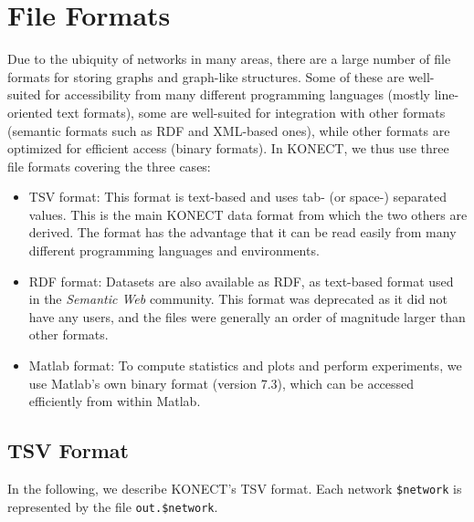 \documentclass{article}
\begin{document}
\section{File Formats}
\label{sec:format}
Due to the ubiquity of networks in many areas, there are a large number
of file formats for storing graphs and graph-like structures.  Some of
these are well-suited for accessibility from many different programming
languages (mostly line-oriented text formats), some are well-suited for
integration with other formats (semantic formats such as RDF and
XML-based ones), while other formats are optimized for efficient access
(binary formats).  In KONECT, we thus use three file formats covering
the three cases:
\begin{itemize}
\item TSV format: This format is text-based and uses tab- (or space-) separated 
  values.  This is the main KONECT data format from which the two others
  are derived.  The format has the advantage that it can be read easily
  from many different programming languages and environments.
\item RDF format: Datasets are also available as RDF, as text-based
  format used in the \emph{Semantic Web} community.  
  This format was deprecated as it did not have any users, and the files
  were generally an order of magnitude larger than other formats. 
\item Matlab format: To compute statistics and plots and perform
  experiments, we use Matlab's own binary format (version 7.3), which can be accessed
  efficiently from within Matlab.
\end{itemize}

\subsection{TSV Format}
In the following, we describe KONECT's TSV format.  Each network
\texttt{\$network} is represented by the file \texttt{out.\$network}. 
\end{document}
